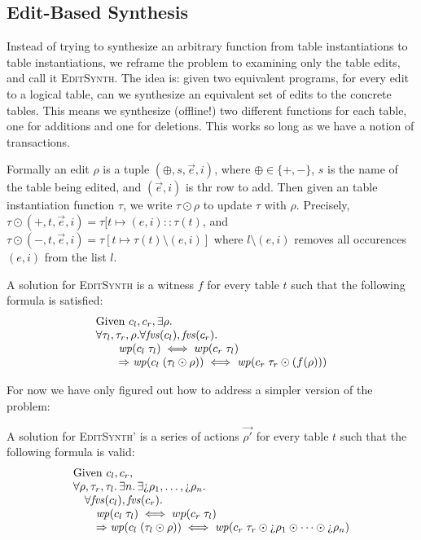\subsection{Edit-Based Synthesis}

Instead of trying to synthesize an arbitrary function from table instantiations
to table instantiations, we reframe the problem to examining only the table
edits, and call it \textsc{EditSynth}. The idea is: given two equivalent
programs, for every edit to a logical table, can we synthesize an equivalent set
of edits to the concrete tables. This means we synthesize (offline!) two
different functions for each table, one for additions and one for
deletions. This works so long as we have a notion of transactions.


Formally an edit $\rho$ is a tuple $(\oplus,s,\vec e,i)$, where
$\oplus \in \{+,-\}$, $s$ is the name of the table being edited, and
$(\vec e, i)$ is thr row to add. Then given an table instantiation function
$\tau$, we write $\tau \odot \rho$ to update $\tau$ with $\rho$. Precisely,
$\tau \odot (+,t,\vec e, i) = \tau[t \mapsto (e,i)::\tau(t)$, and
$\tau \odot (-, t, \vec e, i) = \tau[t \mapsto \tau(t) \setminus (e,i)]$ where
$l \setminus (e,i)$ removes all occurences $(e,i)$ from the list $l$.


A solution for \textsc{EditSynth} is a witness $f$ for every table $t$ such that
the following formula is satisfied:
\[\begin{array}{l}
    \text{Given } c_l,c_r, \exists \rho. \\
    \forall \tau_l,\tau_r,\rho. \forall \mathit{fvs}(c_l), \mathit{fvs}(c_r). \\
    \qquad \mathit{wp}(c_l\; \tau_l) \iff wp(c_r\; \tau_l) \\
    \qquad \Rightarrow \mathit{wp}(c_l\; (\tau_l \odot \rho)) \iff \mathit{wp}(c_r\; \tau_r \odot (f(\rho)))
  \end{array}\]

For now we have only figured out how to address a simpler version of the
problem:

A solution for \textsc{EditSynth'} is a series of actions $\vec{\rho'}$ for every table $t$ such that
the following formula is valid:
\[\begin{array}{l}
    \text{Given } c_l,c_r, \\
    \forall \rho, \tau_r, \tau_l.\, \exists n.\, \exists \hole\rho_1,\ldots,\hole\rho_n. \\ 
    \quad \forall \fvs(c_l), \fvs(c_r). \\
    \qquad \wp(c_l\; \tau_l) \iff wp(c_r\; \tau_l) \\
    \qquad \Rightarrow \wp(c_l\; (\tau_l \odot \rho)) \iff \wp(c_r\; \tau_r
    \odot \hole\rho_1 \odot \cdots \odot \hole\rho_n )
  \end{array}\]

